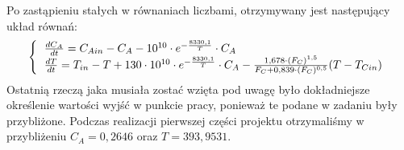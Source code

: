 Po zastąpieniu stałych w równaniach liczbami, otrzymywany jest następujący układ równań:\\
\begin{equation}
	\left\{
	\begin{tabular}{l}
	$\frac{dC_A}{dt} = C_{Ain} - C_A - 10^{10}\cdot e^{-\frac{8330,1}{T}}\cdot C_A$\\
	$\frac{dT}{dt} = T_{in} - T + 130\cdot 10^{10}\cdot e^{-\frac{8330,1}{T}}\cdot C_A-\frac{1,678\cdot (F_C)^{1,5}}{F_C+0,839\cdot (F_C)^{0,5}}(T-T_{Cin})$
	\end{tabular}
	\right.
\end{equation}
Ostatnią rzeczą jaka musiała zostać wzięta pod uwagę było dokładniejsze określenie wartości wyjść w punkcie pracy, ponieważ te podane w zadaniu były przybliżone. Podczas realizacji pierwszej części projektu otrzymaliśmy w przybliżeniu $C_A = 0,2646$ oraz $T = 393,9531$.
